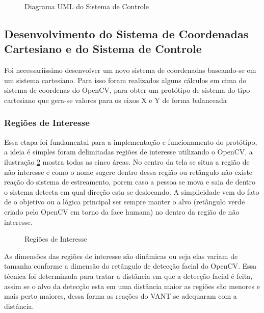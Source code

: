 \begin{figure}[H]
	\centering	
	\caption{Diagrama UML do Sistema de Controle}
	\fontsize{9pt}{12pt}\selectfont
	\def\svgwidth{8cm}
	
	\label{fig:diagcont}
\end{figure}
\subsection{Desenvolvimento do Sistema de Coordenadas Cartesiano e do Sistema de Controle}

Foi necessariíssimo desenvolver um novo sistema de coordenadas baseando-se em um sistema cartesiano. Para isso foram realizados alguns cálculos em cima do sistema de coordenas do OpenCV, para obter um protótipo de sistema do tipo cartesiano que gera-se valores para os eixos X e Y de forma balanceada 

\subsubsection{Regiões de Interesse}

Essa etapa foi fundamental para a implementação e funcionamento do protótipo, a ideia é simples foram delimitadas regiões de interesse utilizando o OpenCV, a ilustração \ref{fig:regint} mostra todas as cinco áreas. No centro da tela se situa a região de não interesse e como o nome sugere dentro dessa região ou retângulo não existe reação do sistema de estreamento, porem caso a pessoa se mova e saia de dentro o sistema detecta em qual direção esta se deslocando. A simplicidade vem do fato de o objetivo ou a lógica principal ser sempre manter o alvo (retângulo verde criado pelo OpenCV em torno da face humana) no dentro da região de não interesse.  

\begin{figure}[H]
	\centering
	\caption{Regiões de Interesse}
	
	\label{fig:regint}
\end{figure}
As dimensões das regiões de interesse são dinâmicas ou seja elas variam de tamanha conforme a dimensão do retângulo de detecção facial do OpenCV. Essa técnica foi determinada para tratar a distância em que a detecção facial é feita, assim se o alvo da detecção esta em uma distância maior as regiões são menores e mais perto maiores, dessa forma as reações do VANT se adequaram com a distância.

